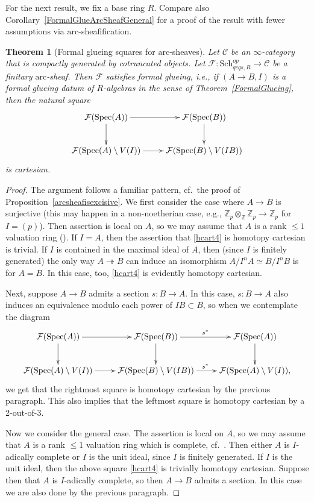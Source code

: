 \documentclass[reqno]{amsart}
\newcommand{\sF}{\mathcal{F}}
\newcommand{\spec}{\mathrm{Spec}}
\newcommand{\arc}{\mathrm{arc}}
\newtheorem{theorem}{Theorem}[section]
\theoremstyle{definition}
\begin{document}
For the next result, we fix
a base ring $R$. 
Compare also 
Corollary~\ref{FormalGlueArcSheafGeneral} for a proof of the result with fewer
assumptions via $\arc$-sheafification. 

\begin{theorem}[Formal glueing squares for $\arc$-sheaves]
\label{arcarithm}
Let $\mathcal{C}$ be an  $\infty$-category that is compactly generated by cotruncated objects.
Let $\sF\colon  \mathrm{Sch}_{qcqs,R}^{op} \to \mathcal{C}$ be a finitary
$\arc$-sheaf. Then $\sF$ satisfies formal glueing, i.e., if  $(A \to B, I)$ is a
formal glueing datum of $R$-algebras in the sense of Theorem~\ref{FormalGlueing},   then  the natural square
\begin{equation}  \label{hcart4} \begin{aligned} \xymatrix{
\sF(\spec (A)) \ar[d]  \ar[r] &  \sF(\spec( B) ) \ar[d]  \\
\sF( \spec (A) \setminus V(I)) \ar[r] &  \sF( \spec( B) \setminus V(IB))
} \end{aligned} \end{equation}
is cartesian.
\end{theorem} 
\begin{proof} 
The argument follows a familiar pattern, cf.~the proof of
Proposition~\ref{arcsheafisexcisive}. 
We first consider the case where $A \to B$ is surjective (this may happen
in a non-noetherian case, e.g., $\mathbb{Z}_p \otimes_{\mathbb{Z}} \mathbb{Z}_p
\to \mathbb{Z}_p$ for $I = (p)$). 
Then assertion is local on $A$,  
so we may assume that $A$ is a rank $\leq 1$ valuation ring
(). 
If $I = A$, then the assertion that \eqref{hcart4} is homotopy cartesian is trivial. If $I$ is contained in the maximal
ideal of $A$, then (since $I$ is finitely generated) the only way $A
\twoheadrightarrow B$ can induce an isomorphism $A/I^n A \simeq B/I^n B$ is for
$A = B$. In this case, too, \eqref{hcart4} is evidently homotopy cartesian. 

Next, suppose $A \to B$ admits a section $s\colon  B \to A$. 
In this case, 
$s\colon  B \to A$ also induces an equivalence modulo each power of $IB \subset B$, so
when we contemplate the diagram
$$
\xymatrix{
\sF(\spec (A)) \ar[d]  \ar[r] &  \sF(\spec( B) ) \ar[d]  
\ar[r]^{s^*} & \sF( \spec (A))  \ar[d] 
\\
\sF( \spec (A) \setminus V(I)) \ar[r] &  \sF( \spec( B) \setminus V(IB))
\ar[r]^{s^*} &
\sF( \spec(A) \setminus V(I)),
} $$
we get that the rightmost square is homotopy cartesian by the previous
paragraph. This also implies that the leftmost square is homotopy cartesian by
a 2-out-of-3. 

Now we consider the general case. 
The assertion is local on 
$A$, so we may assume that $A$ is 
a rank $\leq 1$ valuation ring which is complete, cf.~.
Then either $A$ is $I$-adically complete or $I$ is the unit ideal, since $I$ is
finitely generated. 
If $I$ is the unit ideal, then the above square \eqref{hcart4} is trivially homotopy cartesian. 
Suppose then that $A$ is $I$-adically complete, so then $A \to B$ admits a
section. In this case we are also done by the previous paragraph. 
\end{proof} 
\end{document}
